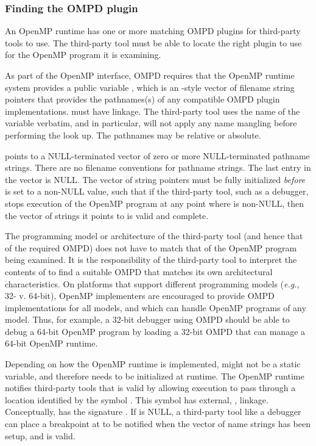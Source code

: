 \subsubsection{Finding the OMPD plugin}
\label{sec:ompd:finding-the-ompd}

An OpenMP runtime has one or more matching OMPD plugins for third-party
tools to use.
The third-party tool must be able to locate the right plugin to use
for the OpenMP program it is examining.

As part of the OpenMP interface, OMPD requires that the OpenMP
runtime system provides a public variable ,
which is an -style vector of filename string pointers that
provides the pathnames(s) of any compatible OMPD plugin implementations.
 must have  linkage.
The third-party tool uses the name of the variable verbatim,
and in particular, will not apply any name mangling before
performing the look up.
The pathnames may be relative or absolute.

 points to a NULL-terminated
vector of zero or more NULL-terminated pathname strings.
There are no filename conventions for pathname strings.
The last entry in the vector is NULL.
The vector of string pointers must be fully initialized \emph{before}
 is set to a non-NULL value,
such that if the third-party tool, such as a debugger,
stops execution of the OpenMP program at any point where
 is non-NULL,
then the vector of strings it points to is valid and complete.

The programming model or architecture of the third-party tool (and hence
that of the required OMPD) does not have to match that of the OpenMP program
being examined.
It is the responsibility of the third-party tool to interpret the contents
of  to find a suitable OMPD that matches
its own architectural characteristics.
On platforms that support different programming models
(\textit{e.g.}, 32- v. 64-bit), OpenMP implementers are encouraged
to provide OMPD implementations for all models, and which can handle
OpenMP programs of any model.
Thus, for example, a 32-bit debugger using OMPD should be able
to debug a 64-bit OpenMP program
by loading a 32-bit OMPD that can manage a 64-bit OpenMP runtime.

Depending on how the OpenMP runtime is implemented, 
might not be a static variable, and therefore needs to be initialized
at runtime.
The OpenMP runtime notifies third-party tools that 
is valid by allowing execution to pass through a location identified
by the symbol .
This symbol has external, , linkage.
Conceptually,  has the signature
.
If  is NULL, a third-party tool like a debugger
can place a breakpoint at  to be notified
when the vector of name strings has been setup, and is valid.

